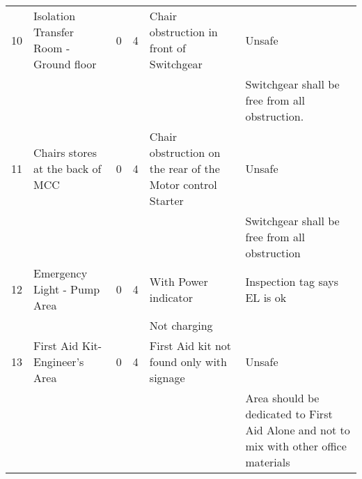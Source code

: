 \begin{table}[!htb]
{\begin{tabular}{c|p{3cm}|c|c|p{4cm}|p{4cm}}
\hline
10 & Isolation Transfer Room - Ground floor   & 0 & 4 & Chair obstruction in front of Switchgear & Unsafe \\ 
&  &  &  &  & Switchgear shall be free from all obstruction. \\ 
\hline
11 & Chairs stores at the back of MCC & 0 & 4 & Chair obstruction on the rear of the Motor control Starter & Unsafe \\ 
&  &  &  &  & Switchgear shall be free from all obstruction \\ 
\hline
12 & Emergency Light - Pump Area & 0 & 4 & With Power indicator & Inspection tag says EL is ok \\ 
&  &  &  & Not charging &  \\ 
\hline
13 & First Aid Kit- Engineer's  Area & 0 & 4 & First Aid kit not found only with signage & Unsafe \\ 
&  &  &  &  & Area should be dedicated to First Aid Alone and not to mix with other office materials \\ 
\hline
\end{tabular}
}
\end{table}


